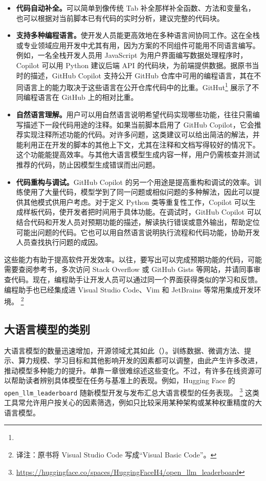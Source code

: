 \begin{itemize}
\item \textbf{代码自动补全。}可以简单到像传统 Tab 补全那样补全函数、方法和变量名，也可以根据对当前脚本已有代码的实时分析，建议完整的代码块。
\item \textbf{支持多种编程语言。}使开发人员能更高效地在多种语言间协同工作。这在全栈或专业领域应用开发中尤其有用，因为方案的不同组件可能用不同语言编写。例如，一名全栈开发人员用 JavaScript 为用户界面编写数据处理程序时，Copilot 可以用 Python 建议后端 API 的代码块，为前端提供数据。据原书当时的描述，GitHub Copilot 支持公开 GitHub 仓库中可用的编程语言，其在不同语言上的能力取决于这些语言在公开仓库代码中的比重。GitHut\footnote{\githuturl} 展示了不同编程语言在 GitHub 上的相对比重。
\item \textbf{自然语言理解。}用户可以用自然语言说明希望代码实现哪些功能，往往只需编写描述下一段代码用途的注释。如果当前脚本启用了 GitHub Copilot，它会推荐实现注释所述功能的代码。对许多问题，这类建议可以给出简洁的解法，并能利用正在开发的脚本的其他上下文，尤其在注释和文档写得较好的情况下。这个功能能提高效率。与其他大语言模型生成内容一样，用户仍需核查并测试推荐的代码，防止因模型生成错误而出问题。
\item \textbf{代码重构与调试。}GitHub Copilot 的另一个用途是提高重构和调试的效率。训练使用了大量代码，模型学到了同一问题或相似问题的多种解法，因此可以提供其他模式供用户考虑。对于定义 Python 类等重复性工作，Copilot 可以生成样板代码，使开发者把时间用于具体功能。在调试时，GitHub Copilot 可以结合代码和开发人员对预期功能的描述，解读执行错误或意外输出，帮助定位可能出问题的代码。它也可以用自然语言说明执行流程和代码功能，协助开发人员查找执行问题的成因。
\end{itemize}

这些能力有助于提高软件开发效率。以往，要写出可以完成预期功能的代码，可能需要查阅参考书，多次访问 Stack Overflow 或 GitHub Gists 等网站，并请同事审查代码。现在，编程助手让开发人员可以通过同一个界面获得类似的学习和反馈。编程助手也已经集成进 Visual Studio Code、Vim 和 JetBrains 等常用集成开发环境。%
\footnote{译注：原书将 Visual Studio Code 写成“Visual Basic Code”。}

\subsection{大语言模型的类别}
\label{sec:ch08-categories}
大语言模型的数量迅速增加，开源领域尤其如此（）。训练数据、微调方法、提示、算力规模、学习目标和其他影响开发的因素都可以调整，由此产生许多改进，推动模型多种能力的提升。单靠一章很难综述这些变化。不过，有许多在线资源可以帮助读者辨别具体模型在任务与基准上的表现。例如，Hugging Face 的 \texttt{open\_llm\_leaderboard} 随新模型开发与发布汇总大语言模型的任务表现。%
\footnote{\url{https://huggingface.co/spaces/HuggingFaceH4/open_llm_leaderboard}}
这类工具常允许用户按关心的因素筛选，例如只比较采用某种架构或某种权重精度的大语言模型。

